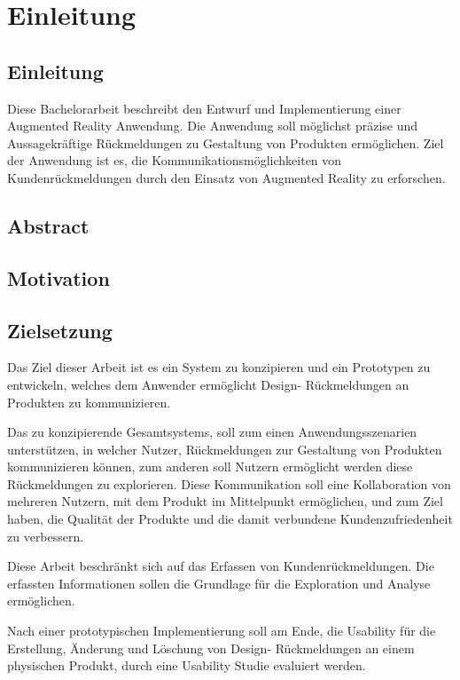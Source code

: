 \chapter{Einleitung}

\section{Einleitung}
Diese Bachelorarbeit beschreibt den Entwurf und Implementierung einer Augmented Reality Anwendung. Die Anwendung soll  möglichst präzise und Aussagekräftige Rückmeldungen zu Gestaltung von Produkten ermöglichen.  Ziel der Anwendung  ist es, die Kommunikationsmöglichkeiten von Kundenrückmeldungen durch den Einsatz von Augmented Reality zu erforschen.

\section{Abstract}

\section{Motivation}


\section{Zielsetzung}

Das Ziel dieser Arbeit ist es ein System zu konzipieren und ein Prototypen zu entwickeln, welches dem Anwender ermöglicht Design- Rückmeldungen an Produkten %
zu kommunizieren. 

Das zu konzipierende Gesamtsystems, soll zum einen Anwendungsszenarien unterstützen, in welcher Nutzer, Rückmeldungen zur Gestaltung von Produkten kommunizieren können, 
zum anderen soll Nutzern ermöglicht werden diese Rückmeldungen zu explorieren. 
Diese Kommunikation soll eine Kollaboration von mehreren Nutzern, mit dem Produkt im Mittelpunkt ermöglichen, und zum Ziel haben, die Qualität der Produkte und die damit 
verbundene Kundenzufriedenheit zu verbessern.

Diese Arbeit beschränkt sich auf das Erfassen von Kundenrückmeldungen. Die erfassten Informationen sollen die Grundlage für 
die Exploration und Analyse ermöglichen.

Nach einer prototypischen Implementierung soll am Ende, die Usability für die Erstellung, Änderung und Löschung von Design- Rückmeldungen an einem physischen Produkt, 
durch eine Usability Studie evaluiert werden. 

